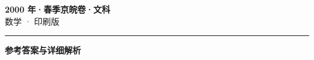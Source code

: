\documentclass[zihao=5, a4paper]{ctexart}
\begin{document}
\begin{center}
  {\Large\bfseries 2000 年·春季京皖卷·文科}\\[4pt]
  {\large 数学 · 印刷版}
\end{center}
\medskip
{}

\par\bigskip\hrule\bigskip
{}
\begin{center}{\large\bfseries 参考答案与详细解析}\end{center}
\smallskip

\end{document}
